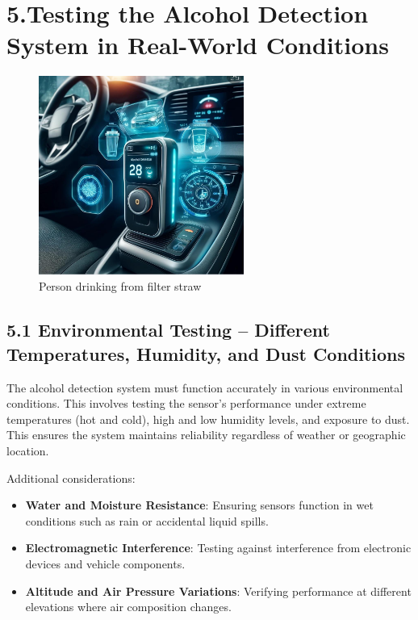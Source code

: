 \documentclass{article}
\begin{document}
\newpage

\section {5.Testing the Alcohol Detection System in Real-World Conditions}

\begin{figure}[h!]
    \centering
    \includegraphics[width=0.6\textwidth]{ac/5.jpg}
    \caption{Person drinking from filter straw}
    \label{fig:Drinking_water}
\end{figure}


\subsection {5.1 Environmental Testing – Different Temperatures, Humidity, and Dust Conditions}
The alcohol detection system must function accurately in various environmental conditions. This involves testing the sensor's performance under extreme temperatures (hot and cold), high and low humidity levels, and exposure to dust. This ensures the system maintains reliability regardless of weather or geographic location.

Additional considerations:
\begin{itemize}
    \item \textbf{Water and Moisture Resistance}: Ensuring sensors function in wet conditions such as rain or accidental liquid spills.
    \item \textbf{Electromagnetic Interference}: Testing against interference from electronic devices and vehicle components.
    \item \textbf{Altitude and Air Pressure Variations}: Verifying performance at different elevations where air composition changes.
\end{itemize}
\end{document}
